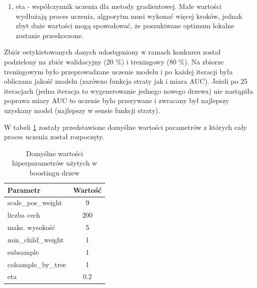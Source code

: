 \documentclass[12pt]{article}
\begin{document}
\begin{enumerate}
    \item eta - współczynnik uczenia dla metody gradientowej. Małe wartości wydłużają proces uczenia, algporytm musi wykonać więcej kroków, jednak zbyt duże wartości mogą spowodować, że poszukiwane optimum lokalne zostanie przeskoczone.
    

\end{enumerate}

Zbiór oetykietowanych danych udostępniony w ramach konkursu został podzielony na zbiór walidacyjny (20 \%) i treningowy (80 \%). Na zbiorze treningowym było przeprowadzane uczenie modelu i po każdej iteracji była obliczana jakość modelu (zarówno funkcja straty jak i miara AUC). Jeżeli po 25 iteracjach (jedna iteracja to wygenerowanie jednego nowego drzewa) nie nastąpiła poprawa miary AUC to uczenie było przerywane i zwracany był najlepszy uzyskany model (najlepszy w sensie funkcji straty). 

W tabeli \ref{tab:xgboost_default_params} zostały przedstawione domyślne wartości parametrów z których cały proces uczenia został rozpoczęty.

\begin{table}[h]
    \centering
    \begin{tabular}{l | c }
        Parametr & Wartość \\ \hline
        scale\_pos\_weight & 9 \\
        liczba cech & 200 \\
        maks. wysokość & 5 \\
        min\_child\_weight & 1 \\
        subsample & 1 \\
        colsample\_by\_tree & 1 \\
        eta & 0.2 \\
    \end{tabular}
    \caption{Domyślne wartości hiperparametrów użytych w boostingu drzew}
    \label{tab:xgboost_default_params}
\end{table}
\end{document}
